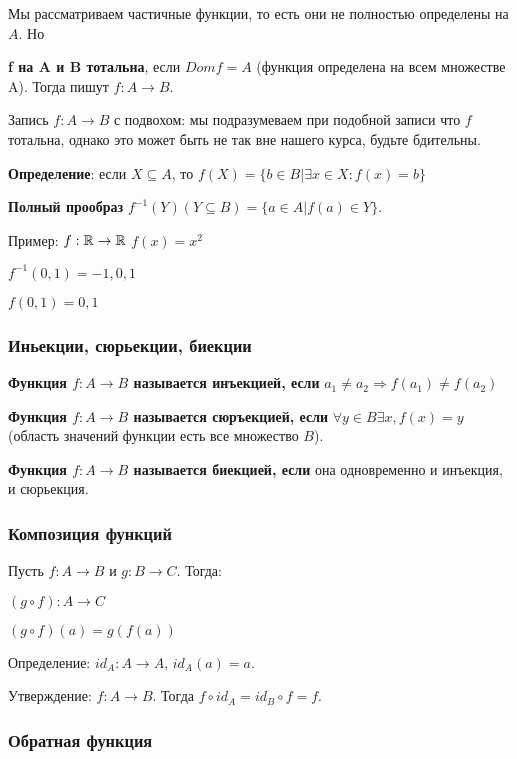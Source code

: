 \documentclass[openany]{article}
\begin{document}
   Мы рассматриваем частичные функции, то есть они не полностью определены на $A$. Но

   \textbf{f на A и B тотальна}, если $Dom f = A$ (функция определена на всем множестве A). Тогда пишут $f: A \rightarrow B$.

   Запись $f: A \rightarrow B$ с подвохом: мы подразумеваем при подобной записи что $f$ тотальна, однако это может быть не так вне нашего курса, будьте бдительны.

   \textbf{Определение}: если $X \subseteq A$, то $f(X) = \{b \in B| \exists x \in X: f(x) = b\}$

   \textbf{Полный прообраз} $f^{-1}(Y) (Y \subseteq B) = \{a \in A| f(a) \in Y\}$.

   Пример: $f: \mathbb{R} \rightarrow \mathbb{R}$ $f(x) = x^2$

   $f^{-1}({0, 1}) = {-1, 0, 1}$

   $f({0, 1}) = {0, 1}$

   \subsubsection{Иньекции, сюрьекции, биекции}

   \textbf{Функция $f: A \rightarrow B$ называется инъекцией, если} $a_1 \neq a_2 \Rightarrow f(a_1) \neq f(a_2)$

   \textbf{Функция $f: A \rightarrow B$ называется сюръекцией, если} $\forall y \in B \exists x, f(x) = y$ (область значений функции есть все множество $B$).

   \textbf{Функция $f: A \rightarrow B$ называется биекцией, если} она одновременно и инъекция, и сюрьекция.

   \subsubsection{Композиция функций}

   Пусть $f: A \rightarrow B$ и $g: B \rightarrow C$. Тогда:

   $(g \circ f): A \rightarrow C$

   $(g \circ f)(a) = g(f(a))$

   Определение: $id_A: A \rightarrow A$, $id_A(a) = a$.

   Утверждение: $f: A \rightarrow B$. Тогда $f \circ id_A = id_B \circ f = f$.

   \subsubsection{Обратная функция}
\end{document}
